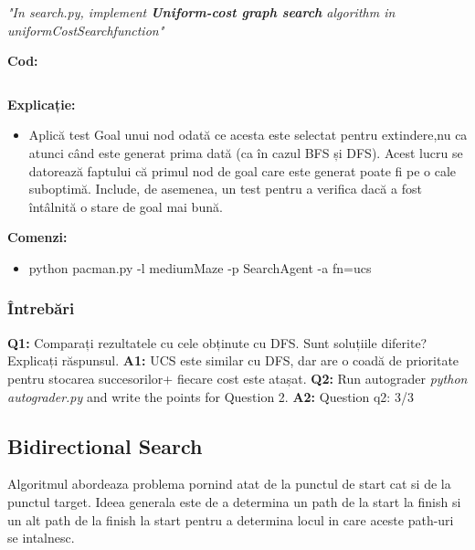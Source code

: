 \textit{"In search.py,  implement  \textbf{Uniform-cost graph search} algorithm  in \textit{uniformCostSearchfunction}"}

\textbf{Cod:}
\inputminted[linenos]{python}{code/03_ucs.py}

\textbf{Explicație:}
\begin{itemize}
    \setlength\itemsep{0em}
    \item Aplică test Goal unui nod odată ce acesta este selectat pentru extindere,nu ca atunci când este generat prima dată (ca în cazul BFS și DFS). Acest lucru se datorează faptului că primul nod de goal care este generat poate fi pe o cale suboptimă. Include, de asemenea, un test pentru a verifica dacă a fost întâlnită o stare de goal mai bună.

\end{itemize}

\textbf{Comenzi:}
\begin{itemize}
    \setlength\itemsep{0em}
    \item python pacman.py -l mediumMaze -p SearchAgent -a fn=ucs
        
\end{itemize}

\subsubsection{Întrebări}

\textbf{Q1:} Comparați rezultatele cu cele obținute cu DFS. Sunt soluțiile diferite? Explicați răspunsul.
\newline
\textbf{A1:} UCS este similar cu DFS, dar are o coadă de prioritate pentru stocarea succesorilor+ fiecare cost este atașat.
\newline
\newline
\textbf{Q2:} Run autograder \textit{python autograder.py} and write the points for Question 2.
\newline
\textbf{A2:} Question q2: 3/3
\newline
\vspace{0.75cm}
\pagebreak


\subsection{Bidirectional Search}
Algoritmul abordeaza problema pornind atat de la punctul de start cat si de la punctul target. Ideea generala este de a determina un path de la start la finish si un alt path de la finish la start pentru a determina locul in care aceste path-uri se intalnesc.\newline

